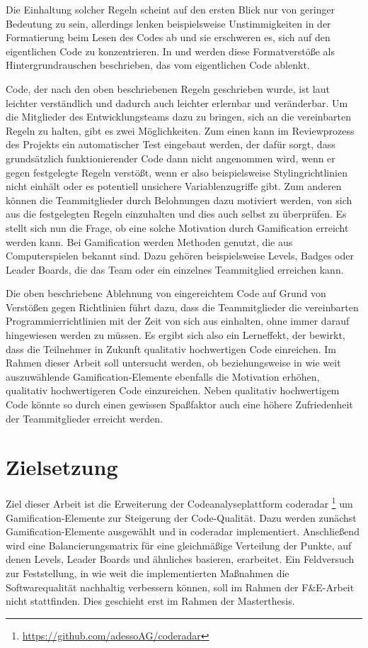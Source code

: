 \documentclass[
	oneside,  %
	ngerman, 
	final, 
	11pt, 
	a4paper, 
	1.1headlines, 
	headinclude=false, 
	footinclude=false, 
	mpinclude=false, 
	pagesize, 
	onecolumn, 
	titlepage, 
	parskip=half, 
	headsepline, 
	chapterprefix=false, 
	version=first, 
	listof=totoc, 
	bibliography=totoc, 
	toc=graduated, 
	fleqn
]{scrbook}
\begin{document}
Die Einhaltung solcher Regeln scheint auf den ersten Blick nur von geringer Bedeutung zu sein, allerdings lenken beispielsweise Unstimmigkeiten in der Formatierung beim Lesen des Codes ab und sie erschweren es, sich auf den eigentlichen Code zu konzentrieren.
In \cite{PJ2015} und \cite{SP2011} werden diese Formatverstöße als Hintergrundrauschen beschrieben, das vom eigentlichen Code ablenkt. 

Code, der nach den oben beschriebenen Regeln geschrieben wurde, ist laut \cite{PJ2015} leichter verständlich und dadurch auch leichter erlernbar und veränderbar.
Um die Mitglieder des Entwicklungsteams dazu zu bringen, sich an die vereinbarten Regeln zu halten, gibt es zwei Möglichkeiten.
Zum einen kann im Reviewprozess des Projekts ein automatischer Test eingebaut werden, der dafür sorgt, dass grundsätzlich funktionierender Code dann nicht angenommen wird, wenn er gegen festgelegte Regeln verstößt, wenn er also beispielsweise Stylingrichtlinien nicht einhält oder es potentiell unsichere Variablenzugriffe gibt.
Zum anderen können die Teammitglieder durch Belohnungen dazu motiviert werden, von sich aus die festgelegten Regeln einzuhalten und dies auch selbst zu überprüfen. 
Es stellt sich nun die Frage, ob eine solche Motivation durch Gamification erreicht werden kann.
Bei Gamification werden Methoden genutzt, die aus Computerspielen bekannt sind.
Dazu gehören beispielsweise Levels, Badges oder Leader Boards, die das Team oder ein einzelnes Teammitglied erreichen kann. 

Die oben beschriebene Ablehnung von eingereichtem Code auf Grund von Verstößen gegen Richtlinien führt dazu, dass die Teammitglieder die vereinbarten Programmierrichtlinien mit der Zeit von sich aus einhalten, ohne immer darauf hingewiesen werden zu müssen.
Es ergibt sich also ein Lerneffekt, der bewirkt, dass die Teilnehmer in Zukunft qualitativ hochwertigen Code einreichen.
Im Rahmen dieser Arbeit soll untersucht werden, ob beziehungsweise in wie weit auszuwählende Gamification-Elemente ebenfalls die Motivation erhöhen, qualitativ hochwertigeren Code einzureichen.
Neben qualitativ hochwertigem Code könnte so durch einen gewissen \glqq Spaßfaktor\grqq{} auch eine höhere Zufriedenheit der Teammitglieder erreicht werden.
		
\section{Zielsetzung}
\label{Zielsetzung}
Ziel dieser Arbeit ist die Erweiterung der Codeanalyseplattform coderadar \footnote{\url{https://github.com/adessoAG/coderadar}} um Gamification-Elemente zur Steigerung der Code-Qualität.
Dazu werden zunächst Gamification-Elemente ausgewählt und in coderadar implementiert.
Anschließend wird eine Balancierungsmatrix für eine gleichmäßige Verteilung der Punkte, auf denen Levels, Leader Boards und ähnliches basieren, erarbeitet.
Ein Feldversuch zur Feststellung, in wie weit die implementierten Maßnahmen die Softwarequalität nachhaltig verbessern können, soll im Rahmen der F\&E-Arbeit nicht stattfinden.
Dies geschieht erst im Rahmen der Masterthesis.
		
\end{document}
